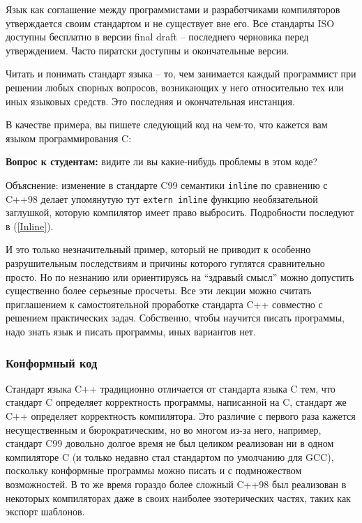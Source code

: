 \documentclass[a4paper,12pt,oneside]{article}
\newif\ifanswers
\begin{document}
Язык как соглашение между программистами и разработчиками компиляторов утверждается своим стандартом и не существует вне его. Все стандарты ISO доступны бесплатно в версии final draft – последнего черновика перед утверждением. Часто пиратски доступны и окончательные версии.

Читать и понимать стандарт языка – то, чем занимается каждый программист при решении любых спорных вопросов, возникающих у него относительно тех или иных языковых средств. Это последняя и окончательная инстанция.

В качестве примера, вы пишете следующий код на чем-то, что кажется вам языком программирования C:



\textbf{Вопрос к студентам:} видите ли вы какие-нибудь проблемы в этом коде?

\ifanswers
Правильный ответ: проблемы есть. Этот код скомпилируется на GCC 4.9 и не скомпилируется на GCC 5.1 с опциями по умолчанию (проверьте, скомпилируется ли он на вашем любимом компиляторе).
\fi

Объяснение: изменение в стандарте C99 семантики \lstinline!inline! по сравнению с C++98 делает упомянутую тут \lstinline!extern inline! функцию необязательной заглушкой, которую компилятор имеет право выбросить. Подробности последуют в (\ref{Inline}).

И это только незначительный пример, который не приводит к особенно разрушительным последствиям и причины которого гуглятся сравнительно просто. Но по незнанию или ориентируясь на ``здравый смысл'' можно допустить существенно более серьезные просчеты. Все эти лекции можно считать приглашением к самостоятельной проработке стандарта C++ совместно с решением практических задач. Собственно, чтобы научится писать программы, надо знать язык и писать программы, иных вариантов нет.

\subsubsection{Конформный код}\label{ConformingCode}

Стандарт языка C++ традиционно отличается от стандарта языка C тем, что стандарт C определяет корректность программы, написанной на C, стандарт же C++ определяет корректность компилятора. Это различие с первого раза кажется несущественным и бюрократическим, но во многом из-за него, например, стандарт C99 довольно долгое время не был целиком реализован ни в одном компиляторе C (и только недавно стал стандартом по умолчанию для GCC), поскольку конформные программы можно писать и с подмножеством возможностей. В то же время гораздо более сложный C++98 был реализован в некоторых компиляторах даже в своих наиболее эзотерических частях, таких как экспорт шаблонов.
\end{document}
